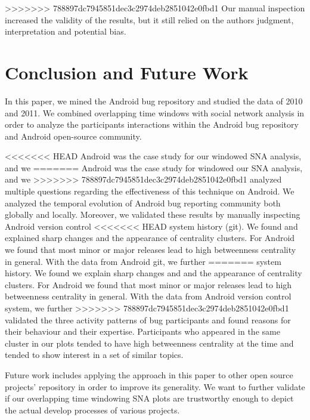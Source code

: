 \documentclass[conference]{IEEEtran}
\begin{document}
>>>>>>> 788897dc7945851dec3c2974deb2851042e0fbd1
Our manual inspection increased the validity of the results, but it
still relied on the authors judgment, interpretation and potential bias.

\section{Conclusion and Future Work}
\label{conclusion}

In this paper, we mined the Android bug repository and studied the
data of 2010 and 2011. We combined overlapping time windows with
social network analysis in order to analyze the participants
interactions within the Android bug repository and Android open-source community.

<<<<<<< HEAD
Android was the case study for our windowed SNA analysis, and we
=======
Android was the case study for windowed our SNA analysis, and we
>>>>>>> 788897dc7945851dec3c2974deb2851042e0fbd1
analyzed multiple questions regarding the effectiveness of this
technique on Android.  We analyzed the temporal evolution of Android
bug reporting community both globally and locally.  Moreover, we
validated these results by manually inspecting Android version control
<<<<<<< HEAD
system history (git). We found and explained sharp changes and the
appearance of centrality clusters.  For Android we found that most
minor or major releases lead to high betweenness centrality in
general. With the data from Android git, we further
=======
system history. We found we explain sharp changes and and the
appearance of centrality clusters.  For Android we found that most
minor or major releases lead to high betweenness centrality in
general. With the data from Android version control system, we further
>>>>>>> 788897dc7945851dec3c2974deb2851042e0fbd1
validated the three activity patterns of bug participants and found
reasons for their behaviour and their expertise.  Participants who
appeared in the same cluster in our plots tended to 
have high betweenness centrality at the time and tended to show interest
in a set of similar topics.


Future work includes applying the approach in this paper to other open
source projects' repository in order to improve its generality. We
want to further validate if our overlapping time windowing SNA plots
are trustworthy enough to depict the actual develop processes of
various projects.




\end{document}

